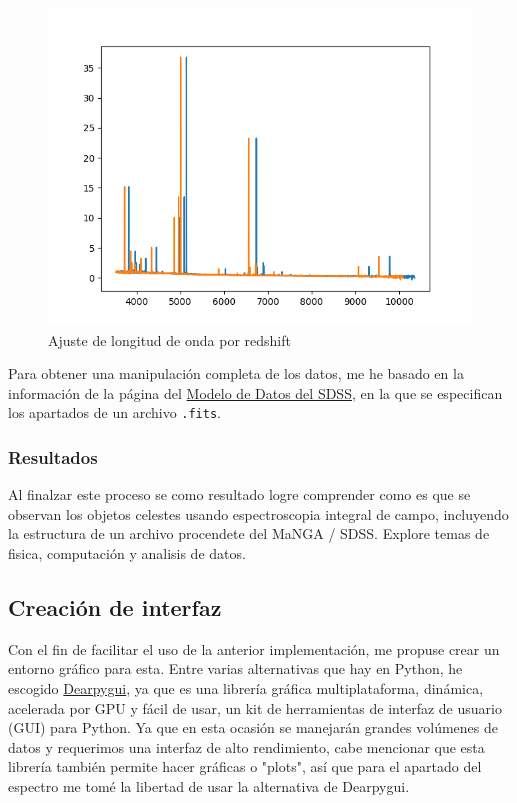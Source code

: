 \documentclass[9pt,twocolumn,a4paper]{opticajnl}
\begin{document}
\begin{figure}
    \centering
    \includegraphics[width=1\linewidth]{redshift_ajuste.png}
    \caption{Ajuste de longitud de onda por redshift}
    \label{fig:redshift_ajuste}
\end{figure}

Para obtener una manipulación completa de los datos, me he basado en la información de la página del \href{https://data.sdss.org/datamodel/files/MANGA_SPECTRO_DATA/MJD5/sdR.html}{Modelo de Datos del SDSS}, en la que se especifican los apartados de un archivo \verb|.fits|.

\subsubsection*{Resultados}
Al finalzar este proceso se como resultado logre comprender como es que se observan los objetos celestes usando espectroscopia integral de campo, incluyendo la estructura de un archivo procendete del MaNGA / SDSS. Explore temas de fisica, computación y analisis de datos.  

\subsection*{Creación de interfaz}
Con el fin de facilitar el uso de la anterior implementación, me propuse crear un entorno gráfico para esta. Entre varias alternativas que hay en Python, he escogido \href{https://dearpygui.readthedocs.io/en/latest/}{Dearpygui}, ya que es una librería gráfica multiplataforma, dinámica, acelerada por GPU y fácil de usar, un kit de herramientas de interfaz de usuario (GUI) para Python. Ya que en esta ocasión se manejarán grandes volúmenes de datos y requerimos una interfaz de alto rendimiento, cabe mencionar que esta librería también permite hacer gráficas o "plots", así que para el apartado del espectro me tomé la libertad de usar la alternativa de Dearpygui.
\end{document}
